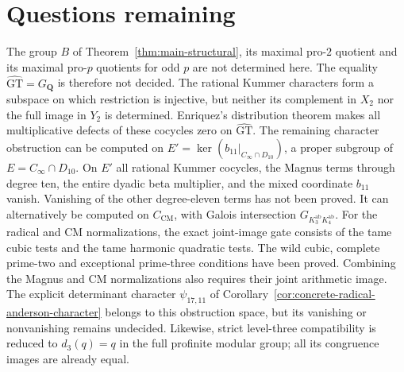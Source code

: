 \documentclass[11pt,a4paper]{article}
\theoremstyle{definition}
\theoremstyle{remark}
\newcommand{\GT}{\widehat{\mathrm{GT}}}
\newcommand{\Q}{\mathbf Q}
\newcommand{\GQ}{G_{\Q}}
\newcommand{\ab}{\mathrm{ab}}
\begin{document}



























\section{Questions remaining}
The group $B$ of Theorem~\ref{thm:main-structural}, its maximal pro-$2$ quotient and its maximal pro-$p$ quotients for odd $p$ are not determined here. The equality $\GT=\GQ$ is therefore not decided. The rational Kummer characters form a subspace on which restriction is injective, but neither its complement in $X_2$ nor the full image in $Y_2$ is determined. Enriquez's distribution theorem makes all multiplicative defects of these cocycles zero on $\GT$. The remaining character obstruction can be computed on $E'=\ker(b_{11}|_{C_\infty\cap D_{10}})$, a proper subgroup of $E=C_\infty\cap D_{10}$. On $E'$ all rational Kummer cocycles, the Magnus terms through degree ten, the entire dyadic beta multiplier, and the mixed coordinate $b_{11}$ vanish. Vanishing of the other degree-eleven terms has not been proved. It can alternatively be computed on $C_{\mathrm{CM}}$, with Galois intersection $G_{K_3^{\ab}K_4^{\ab}}$. For the radical and CM normalizations, the exact joint-image gate consists of the tame cubic tests and the tame harmonic quadratic tests. The wild cubic, complete prime-two and exceptional prime-three conditions have been proved. Combining the Magnus and CM normalizations also requires their joint arithmetic image. The explicit determinant character $\psi_{17,11}$ of Corollary~\ref{cor:concrete-radical-anderson-character} belongs to this obstruction space, but its vanishing or nonvanishing remains undecided. Likewise, strict level-three compatibility is reduced to $d_3(q)=q$ in the full profinite modular group; all its congruence images are already equal.
\end{document}
